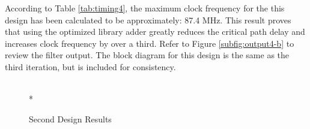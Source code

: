 According to Table \ref{tab:timing4}, the maximum clock frequency for the this design has been calculated to be approximately: 87.4 MHz. This result proves that using the optimized library adder greatly reduces the critical path delay and increases clock frequency by over a third. Refer to Figure \ref{subfig:output4-b} to review the filter output. The block diagram for this design is the same as the third iteration, but is included for consistency. 

\begin{figure}[htp]
  \begin{center}
     \\*
  \end{center}
  \caption{Second Design Results}
  \label{fig:design4_results}
\end{figure}

